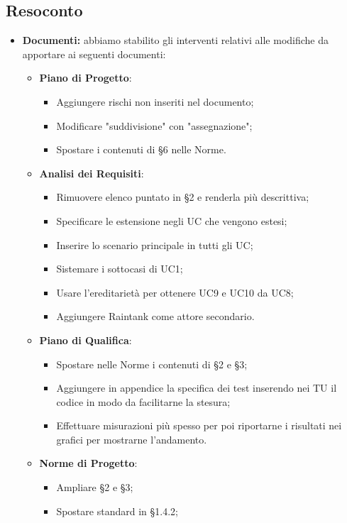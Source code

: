 \subsection{Resoconto}
\begin{itemize}
	\item{ \textbf{Documenti:} abbiamo stabilito gli interventi relativi alle modifiche da apportare ai seguenti documenti:
		\begin{itemize}
			\item \textbf{Piano di Progetto}:
			\begin{itemize}
				\item Aggiungere rischi non inseriti nel documento;
				\item Modificare "suddivisione" con "assegnazione";
				\item Spostare i contenuti di §6 nelle Norme.
			\end{itemize}
			\item \textbf{Analisi dei Requisiti}:
			\begin{itemize}
				\item Rimuovere elenco puntato in §2 e renderla più descrittiva;
				\item Specificare le estensione negli UC che vengono estesi;
				\item Inserire lo scenario principale in tutti gli UC;
				\item Sistemare i sottocasi di UC1;
				\item Usare l'ereditarietà per ottenere UC9 e UC10 da UC8;
				\item Aggiungere Raintank come attore secondario.
			\end{itemize}
			\item \textbf{Piano di Qualifica}: 
			\begin{itemize}
				\item Spostare nelle Norme i contenuti di §2 e §3;
				\item Aggiungere in appendice la specifica dei test inserendo nei TU il codice in modo da facilitarne la stesura;
				\item Effettuare misurazioni più spesso per poi riportarne i risultati nei grafici per mostrarne l'andamento.
			\end{itemize}
			\item \textbf{Norme di Progetto}:
			\begin{itemize}
				\item Ampliare §2 e §3;
				\item Spostare standard in §1.4.2;

\end{itemize}
\end{itemize}}
\end{itemize}
